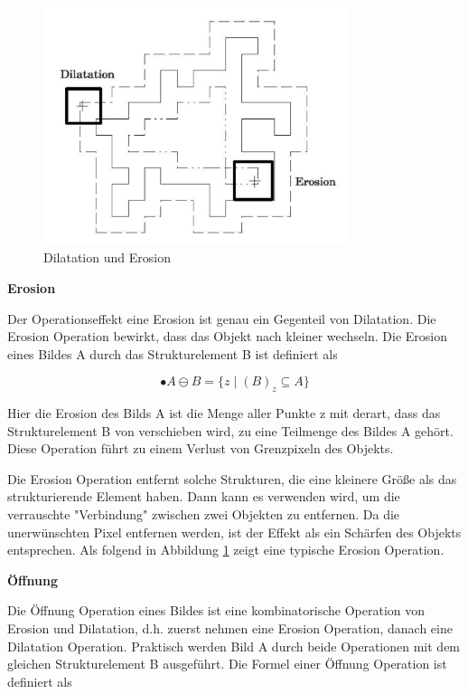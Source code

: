 \begin{figure}[htb]
 \centering 
  \includegraphics[keepaspectratio,width=0.8\textwidth]{images/4_ZweiteErfahrung/Morphological/DilatationundErosion.pdf}
 \caption{Dilatation und Erosion}
 \label{fig:Dilatation und Erosion}
\end{figure} 


\textbf{Erosion}

Der Operationseffekt eine Erosion ist genau ein Gegenteil von Dilatation. Die Erosion Operation bewirkt, dass das Objekt nach kleiner wechseln. Die Erosion eines Bildes A durch das Strukturelement B ist definiert als 

\begin{equation}
•A \ominus B =\lbrace z \mid (B)_z \subseteq A \rbrace  
\end{equation}

Hier die Erosion des Bilds A ist die Menge aller Punkte z mit derart, dass das Strukturelement B von verschieben wird, zu eine Teilmenge des Bildes A 	gehört. Diese Operation führt zu einem Verlust von Grenzpixeln des Objekts.

Die Erosion Operation entfernt solche Strukturen, die eine kleinere Größe als das strukturierende Element haben. Dann kann es verwenden wird, um die verrauschte "Verbindung" zwischen zwei Objekten zu entfernen. Da die unerwünschten Pixel entfernen werden, ist der Effekt als ein Schärfen des Objekts entsprechen. Als folgend in Abbildung \ref{fig:Dilatation und Erosion} zeigt eine typische Erosion Operation.


\textbf{Öffnung}

Die Öffnung Operation eines Bildes ist eine kombinatorische Operation von Erosion und Dilatation, d.h. zuerst nehmen eine Erosion Operation, danach eine Dilatation Operation. Praktisch werden Bild A durch beide Operationen mit dem gleichen Strukturelement B ausgeführt. Die Formel einer Öffnung Operation ist definiert als

